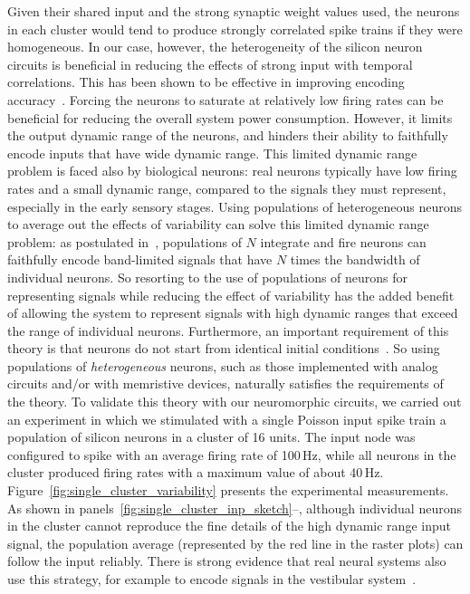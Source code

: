Given their shared input and the strong synaptic weight values used, the neurons in each cluster would tend to produce strongly correlated spike trains if they were homogeneous. In our case, however, the heterogeneity of the silicon neuron circuits is beneficial in reducing the effects of strong input with temporal correlations. This has been shown to be effective in improving encoding accuracy~\cite{Ecker_etal11}.
Forcing the neurons to saturate at relatively low firing rates can be beneficial for reducing the overall system power consumption. However, it limits the output dynamic range of the neurons, and hinders their ability to faithfully encode inputs that have wide dynamic range.
This limited dynamic range problem is faced also by biological neurons: real neurons typically have low firing rates and a small dynamic range, compared to the signals they must represent, especially in the early sensory stages.
Using populations of heterogeneous neurons to average out the effects of variability can solve this limited dynamic range problem: as postulated in~\cite{Adam_etal20}, populations of $N$ integrate and fire neurons can faithfully encode band-limited signals that have $N$ times the bandwidth of individual neurons.
So resorting to the use of populations of neurons for representing signals while reducing the effect of variability has the added benefit of allowing the system to represent signals with high dynamic ranges that exceed the range of individual neurons.
Furthermore, an important requirement of this theory is that neurons do not start from identical initial conditions~\cite{Adam_etal20}. So using populations of \emph{heterogeneous} neurons, such as those implemented with analog circuits and/or with memristive devices, naturally satisfies the requirements of the theory.
To validate this theory with our neuromorphic circuits, we carried out an experiment in which we stimulated with a single Poisson input spike train a population of silicon neurons in a cluster of 16 units. The input node was configured to spike with an average firing rate of 100\,Hz, while all neurons in the cluster produced firing rates with a maximum value of about 40\,Hz. 
Figure~\ref{fig:single_cluster_variability} presents the experimental measurements.
As shown in panels~\ref{fig:single_cluster_inp_sketch}--, although individual neurons in the cluster cannot reproduce the fine details of the high dynamic range input signal, the population average (represented by the red line in the raster plots) can follow the input reliably.
There is strong evidence that real neural systems also use this strategy, for example to encode signals in the vestibular system~\cite{Sadeghi_etal07}.


